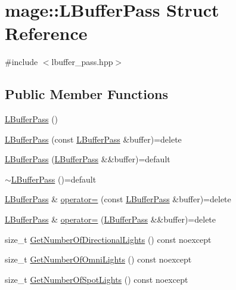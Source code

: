 \hypertarget{structmage_1_1_l_buffer_pass}{}\section{mage\+:\+:L\+Buffer\+Pass Struct Reference}
\label{structmage_1_1_l_buffer_pass}


{\ttfamily \#include $<$lbuffer\+\_\+pass.\+hpp$>$}

\subsection*{Public Member Functions}
\begin{DoxyCompactItemize}
\item 
\hyperlink{structmage_1_1_l_buffer_pass_acde2812780af700501ca945d62ed3dcc}{L\+Buffer\+Pass} ()
\item 
\hyperlink{structmage_1_1_l_buffer_pass_a0cd35fd1ded3c17d04c1689d1e30e476}{L\+Buffer\+Pass} (const \hyperlink{structmage_1_1_l_buffer_pass}{L\+Buffer\+Pass} \&buffer)=delete
\item 
\hyperlink{structmage_1_1_l_buffer_pass_ae87591e020b5c87ba219aad132669276}{L\+Buffer\+Pass} (\hyperlink{structmage_1_1_l_buffer_pass}{L\+Buffer\+Pass} \&\&buffer)=default
\item 
\hyperlink{structmage_1_1_l_buffer_pass_abb6727e9cacfb21ac140aeac68f18171}{$\sim$\+L\+Buffer\+Pass} ()=default
\item 
\hyperlink{structmage_1_1_l_buffer_pass}{L\+Buffer\+Pass} \& \hyperlink{structmage_1_1_l_buffer_pass_aec86026cd14a4b1609f709444bc453bd}{operator=} (const \hyperlink{structmage_1_1_l_buffer_pass}{L\+Buffer\+Pass} \&buffer)=delete
\item 
\hyperlink{structmage_1_1_l_buffer_pass}{L\+Buffer\+Pass} \& \hyperlink{structmage_1_1_l_buffer_pass_a3e4405a5af87c2c6f4839cb8502aa5de}{operator=} (\hyperlink{structmage_1_1_l_buffer_pass}{L\+Buffer\+Pass} \&\&buffer)=delete
\item 
size\+\_\+t \hyperlink{structmage_1_1_l_buffer_pass_a8a8c7af3c9c780f378411b928bb15a67}{Get\+Number\+Of\+Directional\+Lights} () const noexcept
\item 
size\+\_\+t \hyperlink{structmage_1_1_l_buffer_pass_a36adecea35365ec4ecc97698de68463c}{Get\+Number\+Of\+Omni\+Lights} () const noexcept
\item 
size\+\_\+t \hyperlink{structmage_1_1_l_buffer_pass_a52e32579e9843f3d6cf998cbf9a3f362}{Get\+Number\+Of\+Spot\+Lights} () const noexcept
\item 

\end{DoxyCompactItemize}
